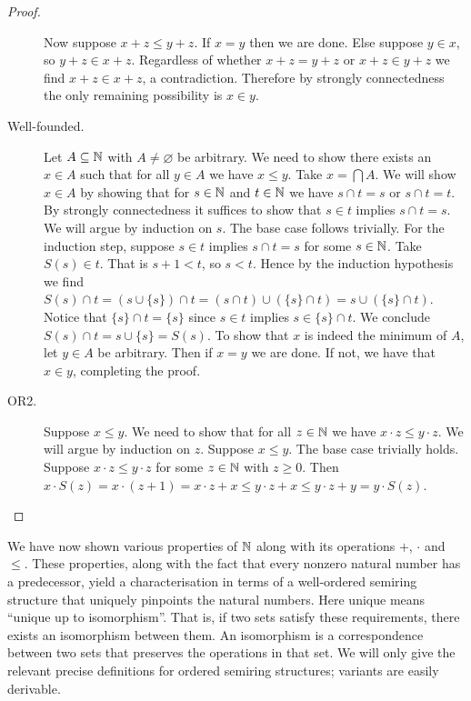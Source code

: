 \documentclass[../main.tex]{subfiles}
\begin{document}
\begin{proof}
\begin{description}
        Now suppose $x+z\leq y+z$. If $x=y$ then we are done. Else suppose $y\in x$, so $y+z\in x+z$. Regardless of whether $x+z=y+z$ or $x+z\in y+z$ we find $x+z\in x+z$, a contradiction. Therefore by strongly connectedness the only remaining possibility is $x\in y$.
        \item[Well-founded.] Let $A\subseteq\mathbb{N}$ with $A\neq\varnothing$ be arbitrary. We need to show there exists an $x\in A$ such that for all $y\in A$ we have $x\leq y$. Take $x=\bigcap A$. We will show $x\in A$ by showing that for $s\in\mathbb{N}$ and $t\in\mathbb{N}$ we have $s\cap t=s$ or $s\cap t=t$. By strongly connectedness it suffices to show that $s\in t$ implies $s\cap t=s$. We will argue by induction on $s$. The base case follows trivially. For the induction step, suppose $s\in t$ implies $s\cap t=s$ for some $s\in\mathbb{N}$. Take $S(s)\in t$. That is $s+1<t$, so $s<t$. Hence by the induction hypothesis we find $S(s)\cap t=(s\cup\{s\})\cap t=(s\cap t)\cup(\{s\}\cap t)=s\cup(\{s\}\cap t)$. Notice that $\{s\}\cap t=\{s\}$ since $s\in t$ implies $s\in\{s\}\cap t$. We conclude $S(s)\cap t=s\cup\{s\}=S(s)$. To show that $x$ is indeed the minimum of $A$, let $y\in A$ be arbitrary. Then if $x=y$ we are done. If not, we have that $x\in y$, completing the proof.
        
        \item[OR2.] Suppose $x\leq y$. We need to show that for all $z\in\mathbb{N}$ we have $x\cdot z\leq y\cdot z$. We will argue by induction on $z$. Suppose $x\leq y$. The base case trivially holds. Suppose $x\cdot z\leq y\cdot z$ for some $z\in\mathbb{N}$ with $z\geq0$. Then $x\cdot S(z)=x\cdot(z+1)=x\cdot z+x\leq y\cdot z+x\leq y\cdot z+y=y\cdot S(z)$.
    \end{description}
\end{proof}
We have now shown various properties of $\mathbb{N}$ along with its operations $+$, $\cdot$ and $\leq$. These properties, along with the fact that every nonzero natural number has a predecessor, yield a characterisation in terms of a well-ordered semiring structure that uniquely pinpoints the natural numbers. Here unique means ``unique up to isomorphism''. That is, if two sets satisfy these requirements, there exists an isomorphism between them. An isomorphism is a correspondence between two sets that preserves the operations in that set. We will only give the relevant precise definitions for ordered semiring structures; variants are easily derivable.
\end{document}
